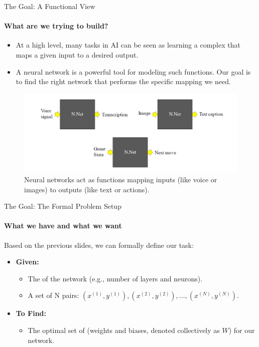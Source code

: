 \begin{frame}{The Goal: A Functional View}
    \framesubtitle{What are we trying to build?}
    \begin{itemize}
        \item At a high level, many tasks in AI can be seen as learning a complex  that maps a given input to a desired output.
        \item A neural network is a powerful tool for modeling such functions. Our goal is to find the right network that performs the specific mapping we need.
    \end{itemize}
    \begin{figure}
        \centering
        \includegraphics[width=0.9\linewidth]{images/nn_as_function.png}
        \caption{Neural networks act as functions mapping inputs (like voice or images) to outputs (like text or actions).}
    \end{figure}
\end{frame}

\begin{frame}{The Goal: The Formal Problem Setup}
    \framesubtitle{What we have and what we want}
    Based on the previous slides, we can formally define our task:
    \begin{itemize}
        \item \textbf{Given:}
        \begin{itemize}
            \item The  of the network (e.g., number of layers and neurons).
            \item A set of N  pairs: $(x^{(1)}, y^{(1)}), (x^{(2)}, y^{(2)}), \dots, (x^{(N)}, y^{(N)})$.
        \end{itemize}
        \medskip
        \item \textbf{To Find:}
        \begin{itemize}
            \item The optimal set of  (weights and biases, denoted collectively as $W$) for our network.
        \end{itemize}
    \end{itemize}
\end{frame}

